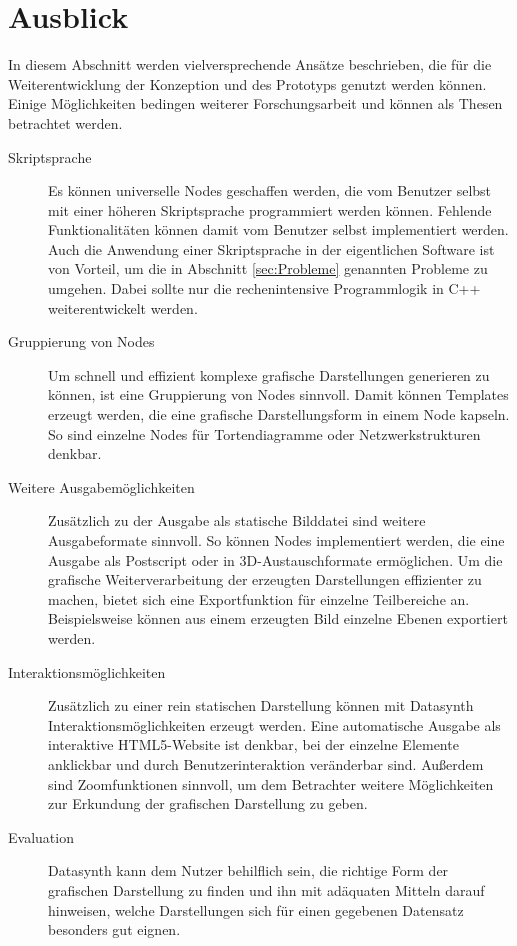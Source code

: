 \documentclass[a4paper, 
               12pt,
               DIV=calc,
               version=first,
               pdftex,
               headsepline,
               footsepline,
               bibtotocnumbered,
               liststotocnumbered]{scrreprt}
\begin{document}
\section{Ausblick}
\label{sec:Ausblick}
In diesem Abschnitt werden vielversprechende Ansätze beschrieben, die für die Weiterentwicklung
der Konzeption und des Prototyps genutzt werden können. Einige Möglichkeiten bedingen weiterer 
Forschungsarbeit und können als Thesen betrachtet werden.
\begin{description}
\item[Skriptsprache]
Es können universelle Nodes geschaffen werden, die vom Benutzer selbst mit einer höheren
Skriptsprache programmiert werden können. Fehlende Funktionalitäten
können damit vom Benutzer selbst implementiert werden.
Auch die Anwendung einer Skriptsprache in der eigentlichen Software ist von Vorteil, um die in
Abschnitt \ref{sec:Probleme} genannten Probleme zu umgehen. Dabei sollte nur
die rechenintensive Programmlogik in C++ weiterentwickelt werden.
\item[Gruppierung von Nodes]
Um schnell und effizient komplexe grafische Darstellungen generieren zu können,
ist eine Gruppierung von Nodes sinnvoll. Damit können Templates erzeugt werden,
die eine grafische Darstellungsform in einem Node kapseln. So sind einzelne Nodes
für Tortendiagramme oder Netzwerkstrukturen denkbar.
\item[Weitere Ausgabemöglichkeiten]
Zusätzlich zu der Ausgabe als statische Bilddatei sind weitere Ausgabeformate sinnvoll.
So können Nodes implementiert werden, die eine Ausgabe als Postscript oder
in 3D-Austauschformate ermöglichen. Um die grafische Weiterverarbeitung der erzeugten
Darstellungen effizienter zu machen, bietet sich eine Exportfunktion für einzelne Teilbereiche
an. Beispielsweise können aus einem erzeugten Bild einzelne Ebenen exportiert werden.
\item[Interaktionsmöglichkeiten]
Zusätzlich zu einer rein statischen Darstellung können mit Datasynth
Interaktionsmöglichkeiten erzeugt werden. Eine automatische
Ausgabe als interaktive HTML5-Website ist denkbar, bei der einzelne Elemente
anklickbar und durch Benutzerinteraktion veränderbar sind. Außerdem sind 
Zoomfunktionen sinnvoll, um dem Betrachter weitere Möglichkeiten zur
Erkundung der grafischen Darstellung zu geben.
\item[Evaluation]
Datasynth kann dem Nutzer behilflich sein, die richtige Form
der grafischen Darstellung zu finden und ihn mit adäquaten Mitteln darauf
hinweisen, welche Darstellungen sich für einen gegebenen Datensatz besonders gut eignen.
\end{description}
    
\end{document}

